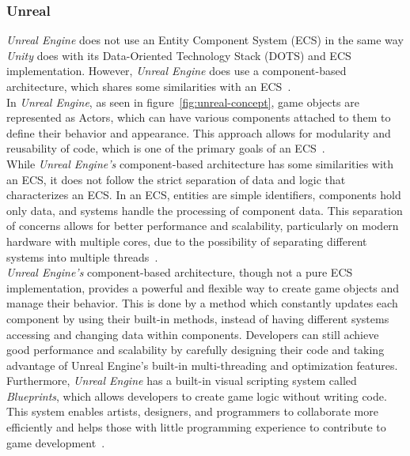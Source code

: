 \subsubsection{Unreal}\label{subsubsec:unreal:-component-based-architecture}
\textit{Unreal Engine} does not use an Entity Component System (\gls{ECS}) in the same way \textit{Unity} does with its Data-Oriented Technology Stack (\gls{DOTS}) and \gls{ECS} implementation.
However, \textit{Unreal Engine} does use a component-based architecture, which shares some similarities with an \gls{ECS}~\cite{UNREAL:Framework}.
\\
In \textit{Unreal Engine}, as seen in figure~\ref{fig:unreal-concept}, game objects are represented as Actors, which can have
various components attached to them to define their behavior and appearance.
This approach allows for modularity and reusability of code, which is one of the primary goals of an \gls{ECS}~\cite{UNREAL:Framework}.
\\
While \textit{Unreal Engine's} component-based architecture has some similarities with an ECS, it does not follow the strict separation of
data and logic that characterizes an ECS. In an ECS, entities are simple identifiers, components hold only data, and systems
handle the processing of component data.
This separation of concerns allows for better performance and scalability, particularly on modern hardware with multiple cores, due to the possibility
of separating different systems into multiple threads~\cite{UNREAL:Framework}.
\\
\textit{Unreal Engine's} component-based architecture, though not a pure \gls{ECS} implementation, provides a powerful
and flexible way to create game objects and manage their behavior.
This is done by a method which constantly updates each component by using their built-in methods, instead of having different systems accessing and changing data within components.
Developers can still achieve good performance and scalability by carefully designing their code and taking
advantage of Unreal Engine's built-in multi-threading and optimization features.
\\
Furthermore, \textit{Unreal Engine} has a built-in visual scripting system called \textit{Blueprints}, which allows developers to create game logic without writing code.
This system enables artists, designers, and programmers to collaborate more efficiently and helps those with little programming experience to contribute
to game development~\cite{UNREAL:Framework}.
